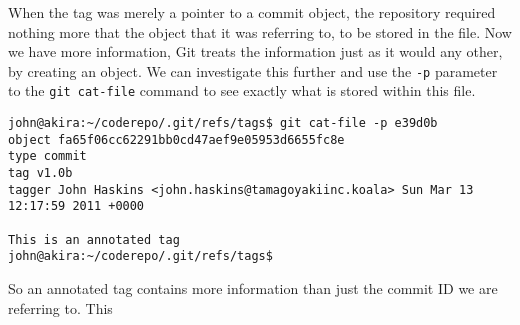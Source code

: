 When the tag was merely a pointer to a commit object, the repository required nothing more that the object that it was referring to, to be stored in the file.  Now we have more information, Git treats the information just as it would any other, by creating an object.  We can investigate this further and use the \texttt{-p} parameter to the \texttt{git cat-file} command to see exactly what is stored within this file.

\begin{Verbatim}[frame=leftline,framerule=1mm,fontsize=\relsize{-3}] 
john@akira:~/coderepo/.git/refs/tags$ git cat-file -p e39d0b
object fa65f06cc62291bb0cd47aef9e05953d6655fc8e
type commit
tag v1.0b
tagger John Haskins <john.haskins@tamagoyakiinc.koala> Sun Mar 13 12:17:59 2011 +0000

This is an annotated tag
john@akira:~/coderepo/.git/refs/tags$ 
\end{Verbatim}

So an annotated tag contains more information than just the commit ID we are referring to.  This 
